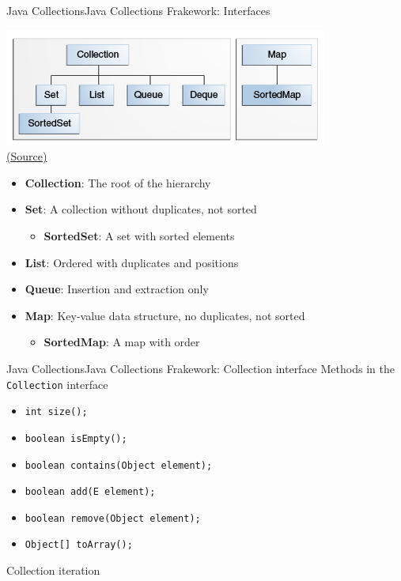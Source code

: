 \documentclass[10pt,compress]{beamer} %
\begin{document}
\begin{frame}{Java Collections}{Java Collections Frakework: Interfaces}
	\begin{center}
	\includegraphics[width=0.6\linewidth]{figs/colls-coreInterfaces.png}\\
	\tiny \href{http://docs.oracle.com/javase/tutorial/collections/interfaces/index.html}{(Source)}
	\end{center}

	\begin{itemize}
		\item \textbf{Collection}: The root of the hierarchy
		\item \textbf{Set}: A collection without duplicates, not sorted
		\begin{itemize}
		\item \textbf{SortedSet}: A set with sorted elements
		\end{itemize}
		\item \textbf{List}: Ordered with duplicates and positions
		\item \textbf{Queue}: Insertion and extraction only
		\item \textbf{Map}: Key-value data structure, no duplicates, not sorted
		\begin{itemize}
		\item \textbf{SortedMap}: A map with order
		\end{itemize}
	\end{itemize}
\end{frame}

\begin{frame}{Java Collections}{Java Collections Frakework: Collection interface}
	Methods in the \texttt{Collection} interface
	\begin{itemize}
		\item \texttt{int size();}
		\item \texttt{boolean isEmpty();}
		\item \texttt{boolean contains(Object element);}
		\item \texttt{boolean add(E element);}
		\item \texttt{boolean remove(Object element);}
		\item \texttt{Object[] toArray();}
	\end{itemize}
	
	\begin{block}{Collection iteration}
	\vspace{-0.2cm}
		
	\vspace{-0.2cm}
	\end{block}

\end{frame}
\end{document}
